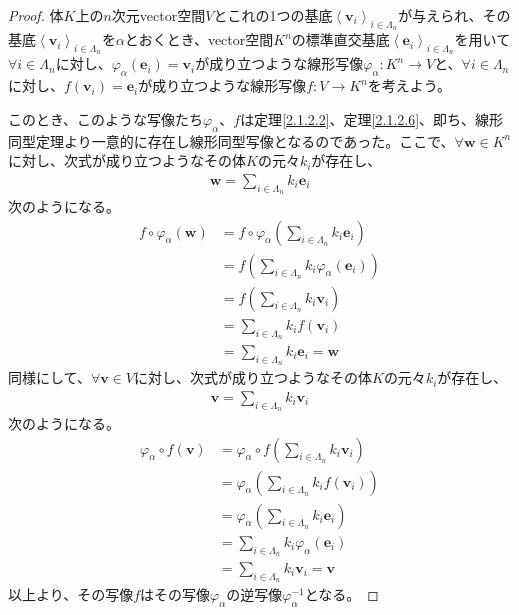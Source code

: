 \documentclass[dvipdfmx]{jsarticle}
\begin{document}
\begin{proof}
体$K$上の$n$次元vector空間$V$とこれの1つの基底$\left\langle \mathbf{v}_{i} \right\rangle_{i \in \varLambda_{n}}$が与えられ、その基底$\left\langle \mathbf{v}_{i} \right\rangle_{i \in \varLambda_{n}}$を$\alpha$とおくとき、vector空間$K^{n}$の標準直交基底$\left\langle \mathbf{e}_{i} \right\rangle_{i \in \varLambda_{n}}$を用いて$\forall i \in \varLambda_{n}$に対し、$\varphi_{\alpha}\left( \mathbf{e}_{i} \right) = \mathbf{v}_{i}$が成り立つような線形写像$\varphi_{\alpha}:K^{n} \rightarrow V$と、$\forall i \in \varLambda_{n}$に対し、$f\left( \mathbf{v}_{i} \right) = \mathbf{e}_{i}$が成り立つような線形写像$f:V \rightarrow K^{n}$を考えよう。\par
このとき、このような写像たち$\varphi_{\alpha}$、$f$は定理\ref{2.1.2.2}、定理\ref{2.1.2.6}、即ち、線形同型定理より一意的に存在し線形同型写像となるのであった。ここで、$\forall\mathbf{w} \in K^{n}$に対し、次式が成り立つようなその体$K$の元々$k_{i}$が存在し、
\begin{align*}
\mathbf{w} = \sum_{i \in \varLambda_{n}} {k_{i}\mathbf{e}_{i}}
\end{align*}
次のようになる。
\begin{align*}
f \circ \varphi_{\alpha}\left( \mathbf{w} \right) &= f \circ \varphi_{\alpha}\left( \sum_{i \in \varLambda_{n}} {k_{i}\mathbf{e}_{i}} \right)\\
&= f\left( \sum_{i \in \varLambda_{n}} {k_{i}\varphi_{\alpha}\left( \mathbf{e}_{i} \right)} \right)\\
&= f\left( \sum_{i \in \varLambda_{n}} {k_{i}\mathbf{v}_{i}} \right)\\
&= \sum_{i \in \varLambda_{n}} {k_{i}f\left( \mathbf{v}_{i} \right)}\\
&= \sum_{i \in \varLambda_{n}} {k_{i}\mathbf{e}_{i}} = \mathbf{w}
\end{align*}
同様にして、$\forall\mathbf{v} \in V$に対し、次式が成り立つようなその体$K$の元々$k_{i}$が存在し、
\begin{align*}
\mathbf{v} = \sum_{i \in \varLambda_{n}} {k_{i}\mathbf{v}_{i}}
\end{align*}
次のようになる。
\begin{align*}
\varphi_{\alpha} \circ f\left( \mathbf{v} \right) &= \varphi_{\alpha} \circ f\left( \sum_{i \in \varLambda_{n}} {k_{i}\mathbf{v}_{i}} \right)\\
&= \varphi_{\alpha}\left( \sum_{i \in \varLambda_{n}} {k_{i}f\left( \mathbf{v}_{i} \right)} \right)\\
&= \varphi_{\alpha}\left( \sum_{i \in \varLambda_{n}} {k_{i}\mathbf{e}_{i}} \right)\\
&= \sum_{i \in \varLambda_{n}} {k_{i}\varphi_{\alpha}\left( \mathbf{e}_{i} \right)}\\
&= \sum_{i \in \varLambda_{n}} {k_{i}\mathbf{v}_{i}} = \mathbf{v}
\end{align*}
以上より、その写像$f$はその写像$\varphi_{\alpha}$の逆写像$\varphi_{\alpha}^{- 1}$となる。
\end{proof}
\end{document}
